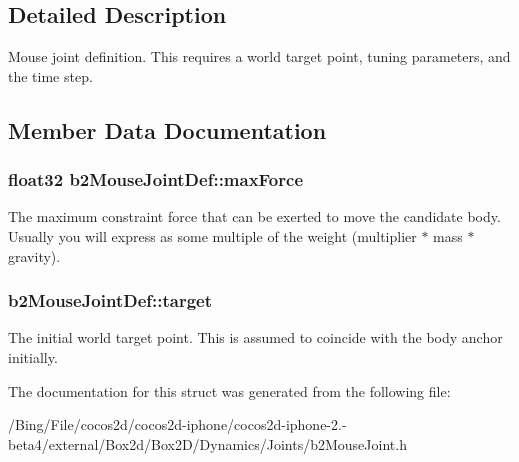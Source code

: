 \subsection{Detailed Description}
Mouse joint definition. This requires a world target point, tuning parameters, and the time step. 

\subsection{Member Data Documentation}
\hypertarget{structb2_mouse_joint_def_ae9c52b3afda8ed006eb62fad163cdc3b}{
\subsubsection[{max\-Force}]{\setlength{\rightskip}{0pt plus 5cm}float32 {\bf b2\-Mouse\-Joint\-Def\-::max\-Force}}}\label{structb2_mouse_joint_def_ae9c52b3afda8ed006eb62fad163cdc3b}
The maximum constraint force that can be exerted to move the candidate body. Usually you will express as some multiple of the weight (multiplier $\ast$ mass $\ast$ gravity). \hypertarget{structb2_mouse_joint_def_aa1b76f72df9aca8d42bdc3e9922e310a}{
\subsubsection[{target}]{ {\bf b2\-Mouse\-Joint\-Def\-::target}}}\label{structb2_mouse_joint_def_aa1b76f72df9aca8d42bdc3e9922e310a}
The initial world target point. This is assumed to coincide with the body anchor initially. 

The documentation for this struct was generated from the following file\-:\begin{DoxyCompactItemize}
\item 
/\-Bing/\-File/cocos2d/cocos2d-\/iphone/cocos2d-\/iphone-\/2.-\/beta4/external/\-Box2d/\-Box2\-D/\-Dynamics/\-Joints/b2\-Mouse\-Joint.\-h\end{DoxyCompactItemize}
